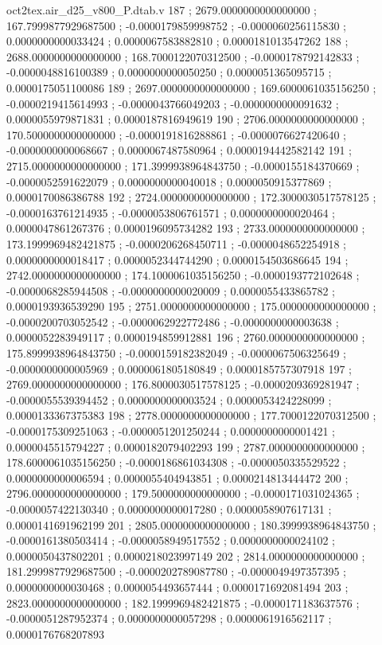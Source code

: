 \begin{filecontents}[overwrite]{oct2tex.air_d25_v800_P.dtab.v}
187 ; 2679.0000000000000000 ; 167.7999877929687500 ; -0.0000179859998752 ; -0.0000060256115830 ; 0.0000000000033424 ; 0.0000067583882810 ; 0.0000181013547262
188 ; 2688.0000000000000000 ; 168.7000122070312500 ; -0.0000178792142833 ; -0.0000048816100389 ; 0.0000000000050250 ; 0.0000051365095715 ; 0.0000175051100086
189 ; 2697.0000000000000000 ; 169.6000061035156250 ; -0.0000219415614993 ; -0.0000043766049203 ; -0.0000000000091632 ; 0.0000055979871831 ; 0.0000187816949619
190 ; 2706.0000000000000000 ; 170.5000000000000000 ; -0.0000191816288861 ; -0.0000076627420640 ; -0.0000000000068667 ; 0.0000067487580964 ; 0.0000194442582142
191 ; 2715.0000000000000000 ; 171.3999938964843750 ; -0.0000155184370669 ; -0.0000052591622079 ; 0.0000000000040018 ; 0.0000050915377869 ; 0.0000170086386788
192 ; 2724.0000000000000000 ; 172.3000030517578125 ; -0.0000163761214935 ; -0.0000053806761571 ; 0.0000000000020464 ; 0.0000047861267376 ; 0.0000196095734282
193 ; 2733.0000000000000000 ; 173.1999969482421875 ; -0.0000206268450711 ; -0.0000048652254918 ; 0.0000000000018417 ; 0.0000052344744290 ; 0.0000154503686645
194 ; 2742.0000000000000000 ; 174.1000061035156250 ; -0.0000193772102648 ; -0.0000068285944508 ; -0.0000000000020009 ; 0.0000055433865782 ; 0.0000193936539290
195 ; 2751.0000000000000000 ; 175.0000000000000000 ; -0.0000200703052542 ; -0.0000062922772486 ; -0.0000000000003638 ; 0.0000052283949117 ; 0.0000194859912881
196 ; 2760.0000000000000000 ; 175.8999938964843750 ; -0.0000159182382049 ; -0.0000067506325649 ; -0.0000000000005969 ; 0.0000061805180849 ; 0.0000185757307918
197 ; 2769.0000000000000000 ; 176.8000030517578125 ; -0.0000209369281947 ; -0.0000055539394452 ; 0.0000000000003524 ; 0.0000053424228099 ; 0.0000133367375383
198 ; 2778.0000000000000000 ; 177.7000122070312500 ; -0.0000175309251063 ; -0.0000051201250244 ; 0.0000000000001421 ; 0.0000045515794227 ; 0.0000182079402293
199 ; 2787.0000000000000000 ; 178.6000061035156250 ; -0.0000186861034308 ; -0.0000050335529522 ; 0.0000000000006594 ; 0.0000055404943851 ; 0.0000214813444472
200 ; 2796.0000000000000000 ; 179.5000000000000000 ; -0.0000171031024365 ; -0.0000057422130340 ; 0.0000000000017280 ; 0.0000058907617131 ; 0.0000141691962199
201 ; 2805.0000000000000000 ; 180.3999938964843750 ; -0.0000161380503414 ; -0.0000058949517552 ; 0.0000000000024102 ; 0.0000050437802201 ; 0.0000218023997149
202 ; 2814.0000000000000000 ; 181.2999877929687500 ; -0.0000202789087780 ; -0.0000049497357395 ; 0.0000000000030468 ; 0.0000054493657444 ; 0.0000171692081494
203 ; 2823.0000000000000000 ; 182.1999969482421875 ; -0.0000171183637576 ; -0.0000051287952374 ; 0.0000000000057298 ; 0.0000061916562117 ; 0.0000176768207893

\end{filecontents}
